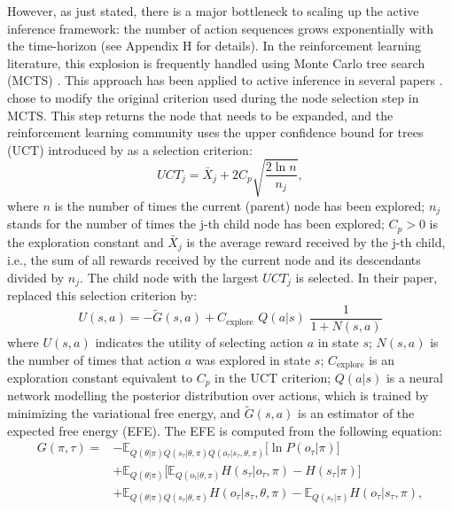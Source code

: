 \documentclass[twoside,11pt]{article}
\begin{document}
However, as just stated, there is a major bottleneck to scaling up the active inference framework: the number of action sequences grows exponentially with the time-horizon (see Appendix H for details). In the reinforcement learning literature, this explosion is frequently handled using Monte Carlo tree search (MCTS) \citep{Go,6145622,MuZero}. This approach has been applied to active inference in several papers \citep{DeepAIwithMCMC,LargePOMDP}. \citet{DeepAIwithMCMC} chose to modify the original criterion used during the node selection step in MCTS. This step returns the node that needs to be expanded, and the reinforcement learning community uses the upper confidence bound for trees (UCT) introduced by \citet{DBLP:conf/ecml/KocsisS06} as a selection criterion:
\begin{equation}\label{eq:uct0}
UCT_j = \bar{X}_j + 2 C_p \sqrt{\frac{2\ln n}{n_j}},
\end{equation}
where $n$ is the number of times the current (parent) node has been explored; $n_j$ stands for the number of times the j-th child node has been explored; $C_p > 0$ is the exploration constant and $\bar{X}_j$ is the average reward received by the j-th child, i.e., the sum of all rewards received by the current node and its descendants divided by $n_j$. The child node with the largest $UCT_j$ is selected. In their paper, \citet{DeepAIwithMCMC} replaced this selection criterion by:
\begin{equation}\label{eq:uct1}
U(s, a) = -\tilde{G}(s, a) + C_{\text{explore}} \,\, Q(a|s) \,\, \frac{1}{1 + N(s, a)}
\end{equation}
where $U(s, a)$ indicates the utility of selecting action $a$ in state $s$; $N(s, a)$ is the number of times that action $a$ was explored in state $s$; $C_{\text{explore}}$ is an exploration constant equivalent to $C_p$ in the UCT criterion; $Q(a|s)$ is a neural network modelling the posterior distribution over actions, which is trained by minimizing the variational free energy, and $\tilde{G}(s, a)$ is an estimator of the expected free energy (EFE). The EFE is computed from the following equation:
\begin{align}
G(\pi, \tau) = &- \mathbb{E}_{Q(\theta|\pi)Q(s_\tau|\theta,\pi)Q(o_\tau|s_\tau,\theta,\pi)}\Big[\ln P(o_\tau|\pi)\Big]\\
&+ \mathbb{E}_{Q(\theta|\pi)}\Big[\mathbb{E}_{Q(o_\tau|\theta,\pi)}H(s_\tau|o_\tau,\pi) - H(s_\tau|\pi)\Big]\\
&+ \mathbb{E}_{Q(\theta|\pi)Q(s_\tau|\theta,\pi)}H(o_\tau|s_\tau,\theta,\pi) - \mathbb{E}_{Q(s_\tau|\pi)}H(o_\tau|s_\tau,\pi),
\end{align}
\end{document}

